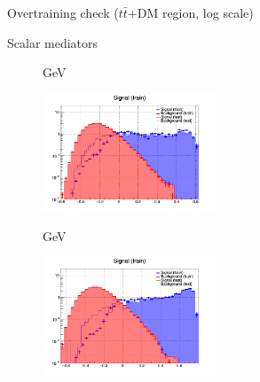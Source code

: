 \documentclass[8pt]{beamer}
\begin{document}
\begin{frame}{Overtraining check ($t \bar t$+DM region, log scale)}
\justifying
\begin{block}{\centering Scalar mediators}\end{block} \vspace{-10pt}
\begin{figure}[htbp]
\centering
\begin{minipage}[b]{.49\textwidth}
\vspace{-5pt}
\begin{block}{ GeV}\end{block}
\begin{center}
\includegraphics[width=5.2cm, height=3.5cm]{figs/log_scalar_overtraining_100GeV_TTbar.png}
\end{center}
\end{minipage}
\begin{minipage}[b]{.02\textwidth}\end{minipage}
\begin{minipage}[b]{.49\textwidth}
\vspace{-5pt}
\begin{block}{ GeV}\end{block}
\begin{center}
\includegraphics[width=5.2cm, height=3.5cm]{figs/log_scalar_overtraining_500GeV_TTbar.png}
\end{center}
\end{minipage}
\end{figure} \vfill


\end{frame}
\end{document}
